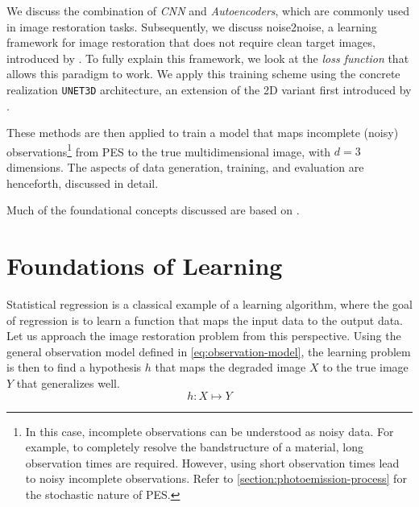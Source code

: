 We discuss the combination of \textit{\gls{CNN}} and \textit{Autoencoders}, which are commonly used in image restoration tasks. Subsequently, we discuss \gls{noise2noise}, a learning framework for image restoration that does not require clean target images, introduced by \citeauthor{lehtinenNoise2NoiseLearningImage2018}. To fully explain this framework, we look at the \textit{loss function} that allows this paradigm to work. We apply this training scheme using the concrete realization \texttt{UNET3D} architecture, an extension of  the 2D variant first introduced by \citeauthor{ronnebergerUNetConvolutionalNetworks}.

These methods are then applied to train a model that maps incomplete (noisy)  observations\footnote{In this case, incomplete observations can be understood as noisy data. For example, to completely resolve the bandstructure of a material, long observation times are required. However, using short observation times lead to noisy incomplete observations. Refer to \cref{section:photoemission-process} for the stochastic nature of \gls{PES}.} from \gls{PES} to the true multidimensional image, with $d=3$ dimensions. The aspects of data generation, training, and evaluation are henceforth, discussed in detail.

Much of the foundational concepts discussed are based on \cite{shalev-shwartzUnderstandingMachineLearning2014a,jamesIntroductionStatisticalLearning2013,tibshiraniElementsStatisticalLearning,goodfellowDeepLearning2016}.

\section{Foundations of Learning}
Statistical regression is a classical example of a learning algorithm, where the goal of regression is to learn a function that maps the input data to the output data. Let us approach the image restoration problem from this perspective. Using the general observation model defined in \cref{eq:observation-model}, the learning problem is then to find a hypothesis $h$  that maps the degraded image $X$ to the true image $Y$ that generalizes well.
\begin{equation}
    h: X \mapsto Y
\end{equation}

